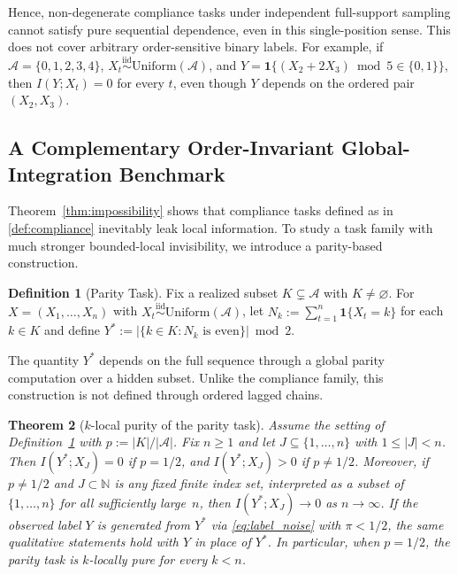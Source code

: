\documentclass{article}
\theoremstyle{plain}
\newtheorem{theorem}{Theorem}[section]
\theoremstyle{definition}
\newtheorem{definition}[theorem]{Definition}
\theoremstyle{remark}
\begin{document}
Hence, non-degenerate compliance tasks under independent full-support sampling cannot satisfy pure sequential dependence, even in this single-position sense. This does not cover arbitrary order-sensitive binary labels. For example, if $\mathcal{A}=\{0,1,2,3,4\}$, $X_t \overset{\mathrm{iid}}{\sim} \mathrm{Uniform}(\mathcal{A})$, and $Y=\mathbf{1}\{(X_2+2X_3)\bmod 5 \in \{0,1\}\}$, then $I(Y;X_t)=0$ for every $t$, even though $Y$ depends on the ordered pair $(X_2,X_3)$.

\subsection{A Complementary Order-Invariant Global-Integration Benchmark}
\label{sec:parity}

Theorem~\ref{thm:impossibility} shows that compliance tasks defined as in \ref{def:compliance} inevitably leak local information. To study a task family with much stronger bounded-local invisibility, we introduce a parity-based construction.

\begin{definition}[Parity Task]
\label{def:parity}
Fix a realized subset $K\subsetneq \mathcal{A}$ with $K\neq\varnothing$. For $X=(X_1,\ldots,X_n)$ with $X_t \overset{\mathrm{iid}}{\sim} \mathrm{Uniform}(\mathcal{A})$, let $N_k := \sum_{t=1}^n \mathbf{1}\{X_t = k\}$ for each $k\in K$ and define $Y^* := |\{k\in K : N_k \text{ is even}\}| \bmod 2$.
\end{definition}

The quantity $Y^*$ depends on the full sequence through a global parity computation over a hidden subset. Unlike the compliance family, this construction is not defined through ordered lagged chains.

\begin{theorem}[$k$-local purity of the parity task]
\label{thm:parity_local_purity}
Assume the setting of Definition~\ref{def:parity} with
$p := |K|/|\mathcal{A}|$.
Fix $n\ge 1$ and let
$J \subseteq \{1,\ldots,n\}$ with $1 \le |J| < n$.
Then $I(Y^*;X_J)=0$ if $p = 1/2$, and $I(Y^*;X_J)>0$ if
$p \neq 1/2$.
Moreover, if $p\neq 1/2$ and $J\subset \mathbb{N}$ is any fixed finite index set, interpreted as a subset of $\{1,\ldots,n\}$ for all sufficiently large~$n$, then $I(Y^*;X_J)\to 0$ as
$n\to\infty$. If the observed label $Y$ is generated from $Y^*$ via
\eqref{eq:label_noise} with $\pi<1/2$, the same qualitative statements hold with $Y$ in place of $Y^*$. In particular, when $p=1/2$, the parity task is $k$-locally pure for every $k<n$.
\end{theorem}
\end{document}
